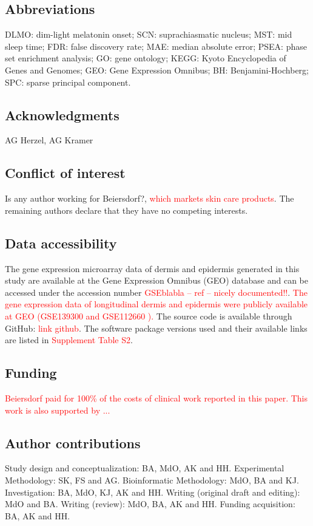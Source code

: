 \subsection*{Abbreviations}
DLMO: dim-light melatonin onset; SCN: suprachiasmatic nucleus; MST: mid sleep time; FDR: false discovery rate; MAE: median absolute error; PSEA: phase set enrichment analysis; GO: gene ontology; KEGG: Kyoto Encyclopedia of Genes and Genomes; GEO: Gene Expression Omnibus; BH: Benjamini-Hochberg; SPC: sparse principal component.

\subsection*{Acknowledgments}
AG Herzel, AG Kramer

\subsection*{Conflict of interest}
Is any author working for Beiersdorf?, \textcolor{red}{which markets skin care products}. The remaining authors declare that they have no competing interests.


\subsection*{Data accessibility}
The gene expression microarray data of dermis and epidermis generated in this study are available at the Gene Expression Omnibus (GEO) database and can be accessed under the accession number \textcolor{red}{GSEblabla -- ref -- nicely documented!!}. \textcolor{red}{The gene expression data of longitudinal dermis and epidermis were publicly available at GEO (GSE139300 \cite{GSE139300} and GSE112660 \cite{GSE112660}). }The source code is available through GitHub: \textcolor{red}{link github}. The software package versions used and their available links are listed in \textcolor{red}{Supplement Table S2}.

\subsection*{Funding}
\textcolor{red}{Beiersdorf paid for 100\% of the costs of clinical work reported in this paper. This work is also supported by ...}

\subsection*{Author contributions}
Study design and conceptualization: BA, MdO, AK and HH. Experimental Methodology: SK, FS and AG. Bioinformatic Methodology: MdO, BA and KJ. Investigation: BA, MdO, KJ, AK and HH. Writing (original draft and editing): MdO and BA. Writing (review): MdO, BA, AK and HH. Funding acquisition: BA, AK and HH.

